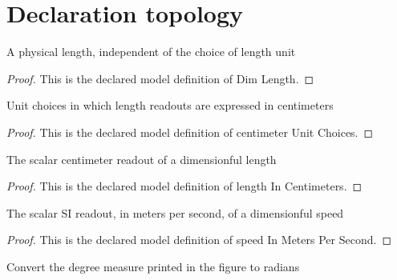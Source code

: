 \section{Declaration topology}
\begin{definition}
  \label{def:physics:phyx-mini-0004:phyxminiproblems-phyxmini0004-dimlength}
  A physical length, independent of the choice of length unit
\end{definition}
\begin{proof}
  This is the declared model definition of Dim Length.
\end{proof}
\begin{definition}
  \label{def:physics:phyx-mini-0004:phyxminiproblems-phyxmini0004-centimeterunitchoices}
  Unit choices in which length readouts are expressed in centimeters
\end{definition}
\begin{proof}
  This is the declared model definition of centimeter Unit Choices.
\end{proof}
\begin{definition}
  \label{def:physics:phyx-mini-0004:phyxminiproblems-phyxmini0004-lengthincentimeters}
  The scalar centimeter readout of a dimensionful length
\end{definition}
\begin{proof}
  This is the declared model definition of length In Centimeters.
\end{proof}
\begin{definition}
  \label{def:physics:phyx-mini-0004:phyxminiproblems-phyxmini0004-speedinmeterspersecond}
  The scalar SI readout, in meters per second, of a dimensionful speed
\end{definition}
\begin{proof}
  This is the declared model definition of speed In Meters Per Second.
\end{proof}
\begin{definition}[degrees]
  \label{def:physics:phyx-mini-0004:phyxminiproblems-phyxmini0004-degrees}
  Convert the degree measure printed in the figure to radians
\end{definition}
